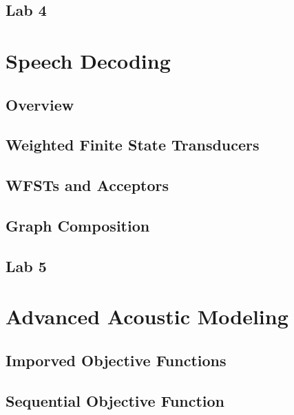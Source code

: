 \subsection{Lab 4}

\section{Speech Decoding}
\subsection{Overview}

\subsection{Weighted Finite State Transducers}

\subsection{WFSTs and Acceptors}

\subsection{Graph Composition}

\subsection{Lab 5}


\section{Advanced Acoustic Modeling}
\subsection{Imporved Objective Functions}

\subsection{Sequential Objective Function}

